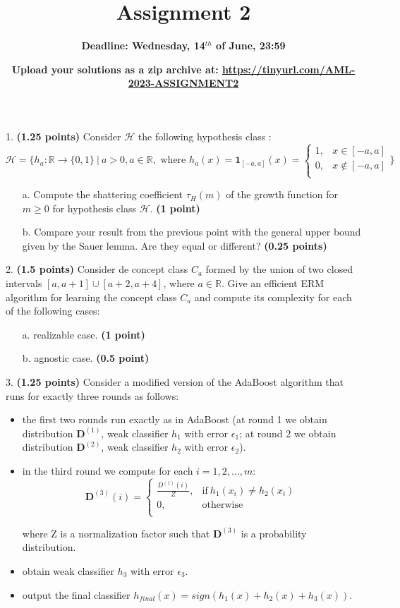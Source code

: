\documentclass{article}
\title{\textbf{Assignment 2}}
\author{\textbf{ {Deadline: Wednesday, 14$^{th}$ of June, 23:59}}}
\date{\textbf{ Upload your solutions as a zip archive at: \url{https://tinyurl.com/AML-2023-ASSIGNMENT2}
}}
\begin{document}
\maketitle

1. \textbf{(1.25 points)} Consider $\mathcal{H}$ the following hypothesis class :
$$\mathcal{H} = \{ h_{a} : \mathbb{R} \rightarrow \{0,1\}\ | \ a > 0, a\in \mathbb{R}, \text{\ where \ } 
h_{a}(x)= \mathbf{1}_{[-a,a]}(x) = \left\{
\begin{array}{ll}
      1, & x \in [-a,a]\\
      0, & x \not\in [-a,a] \\
\end{array} \}
\right. 
$$
\begin{itemize}
    \item[a.] Compute the shattering coefficient $\tau_H(m)$ of the growth function for $m \geq 0$ for hypothesis class $\mathcal{H}$. \textbf{(1 point)}
    \item[b.] Compare your result from the previous point  with the general upper bound given by the Sauer lemma. Are they equal or different? \textbf{(0.25 points)}
\end{itemize}

2. \textbf{(1.5 points)} Consider de concept class $C_a$ formed by the union of two closed intervals $[a,a+1] \cup [a+2,a+4]$, where $a \in \mathbb{R}$. Give an efficient ERM algorithm for learning the concept class $C_a$ and compute its complexity for each of the following cases:

\begin{itemize}
    \item[a.] realizable case. \textbf{(1 point)}
    \item[b.] agnostic case. \textbf{(0.5 point)}
\end{itemize}

3. \textbf{(1.25 points)} Consider a modified version of the AdaBoost algorithm that runs for exactly three rounds as follows:

\begin{itemize}
    \item the first two rounds run exactly as in AdaBoost (at round 1 we obtain distribution $\textbf{D}^{(1)}$, weak classifier $h_1$ with error $\epsilon_1$; at round 2 we obtain distribution $\textbf{D}^{(2)}$, weak classifier $h_2$ with error $\epsilon_2$).
    \item in the third round we compute for each $i = 1, 2, \dots, m$:
    $$\textbf{D}^{(3)}(i) = \left\{
\begin{array}{ll}
    \frac{D^{(1)}(i)}{Z}, & \text{if} \ h_1(x_i) \neq h_2(x_i)\\
    0, & \text{otherwise} \\
\end{array} 
\right.$$

where Z is a normalization factor such that $\textbf{D}^{(3)}$ is a probability distribution.

    \item obtain weak classifier $h_3$ with error $\epsilon_3$.
    \item output the final classifier $h_{final}(x)=sign(h_1(x)+h_2(x)+h_3(x))$.
\end{itemize}
\end{document}
